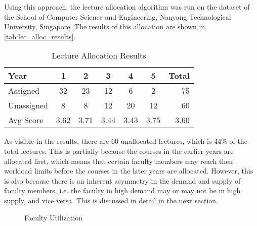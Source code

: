 Using this approach, the lecture allocation algorithm was run on the dataset of the School of Computer Science and Engineering, Nanyang Technological University, Singapore. The results of this allocation are shown in \autoref{tab:lec_alloc_results}.

\begin{table}[H]
  \centering
  \begin{tabular}{|l|c|c|c|c|c|r|}
    \hline
    \textbf{Year} & \textbf{1} & \textbf{2} & \textbf{3} & \textbf{4} & \textbf{5} & \textbf{Total} \\ \hline
    Assigned      & 32         & 23         & 12         & 6          & 2          & 75             \\ \hline
    Unassigned    & 8          & 8          & 12         & 20         & 12         & 60             \\ \hline
    Avg Score     & 3.62       & 3.71       & 3.44       & 3.43       & 3.75       & 3.60           \\ \hline
  \end{tabular}
  \caption{Lecture Allocation Results}
  \label{tab:lec_alloc_results}
\end{table}

As visible in the results, there are 60 unallocated lectures, which is 44\% of the total lectures. This is partially because the courses in the earlier years are allocated first, which means that certain faculty members may reach their workload limits before the courses in the later years are allocated. However, this is also because there is an inherent asymmetry in the demand and supply of faculty members, i.e. the faculty in high demand may or may not be in high supply, and vice versa. This is discussed in detail in the next section.

\begin{figure}[H]
  \centering
  \caption{Faculty Utilization}
  \label{fig:faculty_utilization}
\end{figure}

